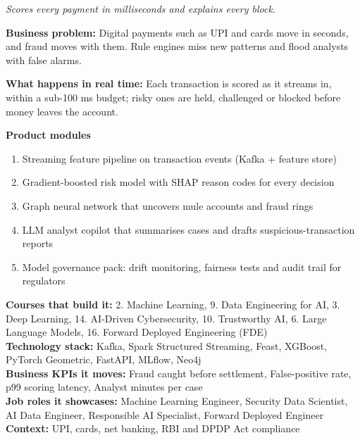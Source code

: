 \documentclass[10pt,a4paper]{article}
\begin{document}
\begin{tcolorbox}[enhanced,breakable,colback=white,colframe=navy,boxrule=0.6pt,arc=2pt,title={\color{goldl}PRODUCT 1 \;|\; BANKING, FINTECH \& PAYMENTS\\\color{white}\large Real-Time Fraud \& Risk Intelligence Platform},colbacktitle=navy,fonttitle=\small\bfseries]
{\small\itshape\color{muted}Scores every payment in milliseconds and explains every block.}\par
\begin{tcolorbox}[colback=l1bg,colframe=l1bg,arc=2pt,borderline west={3pt}{0pt}{saffron},top=2pt,bottom=2pt]\small\textbf{Business problem:} Digital payments such as UPI and cards move in seconds, and fraud moves with them. Rule engines miss new patterns and flood analysts with false alarms.\end{tcolorbox}
\begin{tcolorbox}[colback=l3bg,colframe=l3bg,arc=2pt,borderline west={3pt}{0pt}{igreen},top=2pt,bottom=2pt]\small\textbf{What happens in real time:} Each transaction is scored as it streams in, within a sub-100 ms budget; risky ones are held, challenged or blocked before money leaves the account.\end{tcolorbox}
{\small\textbf{Product modules}}\begin{enumerate}\small
\item Streaming feature pipeline on transaction events (Kafka + feature store)
\item Gradient-boosted risk model with SHAP reason codes for every decision
\item Graph neural network that uncovers mule accounts and fraud rings
\item LLM analyst copilot that summarises cases and drafts suspicious-transaction reports
\item Model governance pack: drift monitoring, fairness tests and audit trail for regulators
\end{enumerate}
{\small\textbf{Courses that build it:} 2. Machine Learning, 9. Data Engineering for AI, 3. Deep Learning, 14. AI-Driven Cybersecurity, 10. Trustworthy AI, 6. Large Language Models, 16. Forward Deployed Engineering (FDE)\\\textbf{Technology stack:} Kafka, Spark Structured Streaming, Feast, XGBoost, PyTorch Geometric, FastAPI, MLflow, Neo4j\\\textbf{Business KPIs it moves:} Fraud caught before settlement, False-positive rate, p99 scoring latency, Analyst minutes per case\\\textbf{Job roles it showcases:} Machine Learning Engineer, Security Data Scientist, AI Data Engineer, Responsible AI Specialist, Forward Deployed Engineer\\\textbf{Context:} UPI, cards, net banking, RBI and DPDP Act compliance}
\end{tcolorbox}
\end{document}
